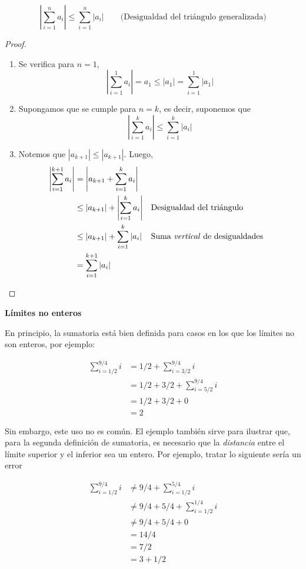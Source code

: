 \[\left| \sum_{i=1}^{n} a_i \right| \leq \sum_{i=1}^{n} |a_i| \qquad \text{(Desigualdad del triángulo generalizada)}\]

\begin{proof}\leavevmode
  \begin{enumerate}[label=\roman*)]
    \item Se verifica para $n=1$,
    \[\left| \sum_{i=1}^{1} a_i \right| = a_1 \leq |a_1| = \sum_{i=1}^{1}|a_1|\]
    \item Supongamos que se cumple para $n=k$, es decir, suponemos que
    \[\left| \sum_{i=1}^{k} a_i \right| \leq \sum_{i=1}^{k} |a_i|\]
    \item Notemos que $|a_{k+1}| \leq |a_{k+1}|$. Luego, 
    \begin{align*}
      \left| \sum_{i=1}^{k+1} a_i \right| &= \left|a_{k+1}+ \sum_{i=1}^{k} a_i \right|\\
      &\leq |a_{k+1}| + \left|\sum_{i=1}^{k} a_i \right| && \text{Desigualdad del triángulo}\\
      &\leq |a_{k+1}| + \sum_{i=1}^{k} |a_i| && \text{Suma \textit{vertical} de desigualdades}\\
      &= \sum_{i=1}^{k+1} |a_i|
    \end{align*}
  \end{enumerate}
\end{proof}

\textbf{Límites no enteros}

En principio, la sumatoria está bien definida para casos en los que los límites no son enteros, por ejemplo:

\begin{align*}
  \sum_{i=1/2}^{9/4} i &= 1/2 + \sum_{i=3/2}^{9/4} i \\
  &= 1/2 + 3/2 + \sum_{i=5/2}^{9/4} i\\
  &= 1/2 + 3/2 + 0\\
  &= 2
\end{align*}

Sin embargo, este uso no es común. El ejemplo también sirve para ilustrar que, para la segunda definición de sumatoria, es necesario que la \textit{distancia} entre el límite superior y el inferior sea un entero. Por ejemplo, tratar lo siguiente sería un error

\begin{align*}
  \sum_{i=1/2}^{9/4} i &\neq 9/4 + \sum_{i=1/2}^{5/4} i\\
  &\neq 9/4 + 5/4 + \sum_{i=1/2}^{1/4} i\\
  &\neq 9/4 + 5/4 + 0\\
  &= 14/4\\
  &= 7/2\\
  &= 3 + 1/2
\end{align*}

